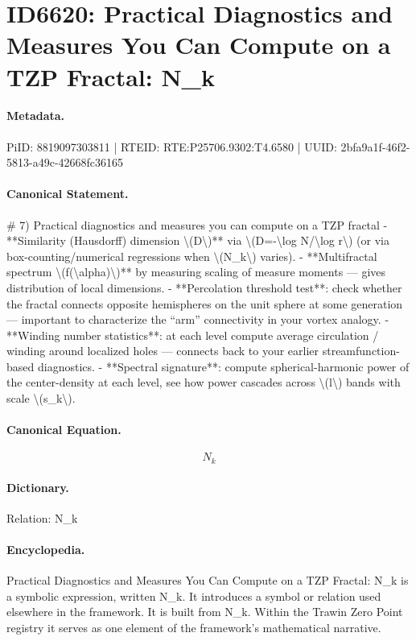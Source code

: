 \section*{ID6620: Practical Diagnostics and Measures You Can Compute on a TZP Fractal: N\_k}
\paragraph{Metadata.}
PiID: 8819097303811 | RTEID: RTE:P25706.9302:T4.6580 | UUID: 2bfa9a1f-46f2-5813-a49c-42668fc36165

\paragraph{Canonical Statement.}
\# 7) Practical diagnostics and measures you can compute on a TZP fractal - **Similarity (Hausdorff) dimension \textbackslash{}(D\textbackslash{})** via \textbackslash{}(D=-\textbackslash{}log N/\textbackslash{}log r\textbackslash{}) (or via box-counting/numerical regressions when \textbackslash{}(N\_k\textbackslash{}) varies). - **Multifractal spectrum \textbackslash{}(f(\textbackslash{}alpha)\textbackslash{})** by measuring scaling of measure moments — gives distribution of local dimensions. - **Percolation threshold test**: check whether the fractal connects opposite hemispheres on the unit sphere at some generation — important to characterize the “arm” connectivity in your vortex analogy. - **Winding number statistics**: at each level compute average circulation / winding around localized holes — connects back to your earlier streamfunction-based diagnostics. - **Spectral signature**: compute spherical-harmonic power of the center-density at each level, see how power cascades across \textbackslash{}(l\textbackslash{}) bands with scale \textbackslash{}(s\_k\textbackslash{}).

\paragraph{Canonical Equation.}
\[
N_k
\]

\paragraph{Dictionary.}
Relation: N\_k

\paragraph{Encyclopedia.}
Practical Diagnostics and Measures You Can Compute on a TZP Fractal: N\_k is a symbolic expression, written N\_k. It introduces a symbol or relation used elsewhere in the framework. It is built from N\_k. Within the Trawin Zero Point registry it serves as one element of the framework's mathematical narrative.
